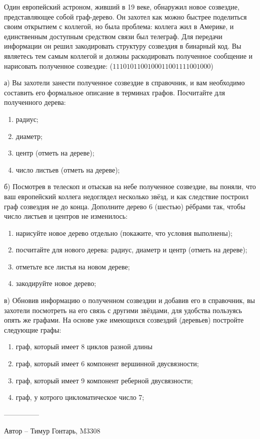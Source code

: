 \question
Один европейский астроном, живший в 19 веке, обнаружил новое созвездие, представляющее собой граф-дерево. Он захотел как можно быстрее поделиться своим открытием с коллегой, но была проблема: коллега жил в Америке, и единственным доступным средством связи был телеграф. Для передачи информации он решил закодировать структуру созвездия в бинарный код. Вы являетесь тем самым коллегой и должны раскодировать полученное сообщение и нарисовать полученное созвездие: ($1110101100100011001111001000$)

а) Вы захотели занести полученное созвездие в справочник, и вам необходимо составить его формальное описание в терминах графов. Посчитайте для полученного дерева:
\begin{enumerate}
\item радиус;
\item диаметр;
\item центр (отметь на дереве);
\item число листьев (отметь на дереве);
\end{enumerate}

б) Посмотрев в телескоп и отыскав на небе полученное созвездие, вы поняли, что ваш европейский коллега недоглядел несколько звёзд, и как следствие построил граф созвездия не до конца. Дополните дерево 6 (шестью) рёбрами так, чтобы число листьев и центров не изменилось:
\begin{enumerate}
\item нарисуйте новое дерево отдельно (покажите, что условия выполнены);
\item посчитайте для нового дерева: радиус, диаметр и центр (отметь на дереве);
\item отметьте все листья на новом дереве;
\item закодируйте новое дерево;
\end{enumerate}

в) Обновив информацию о полученном созвездии и добавив его в справочник, вы захотели посмотреть на его связь с другими звёздами, для удобства пользуясь опять же графами. На основе уже имеющихся созвездий (деревьев) постройте следующие графы:
\begin{enumerate}
\item граф, который имеет 8 циклов разной длины
\item граф, который имеет 6 компонент вершинной двусвязности;
\item граф, который имеет 9 компонент реберной двусвязности;
\item граф, у котрого цикломатическое число 7;
\end{enumerate}

---------------

Автор -- Тимур Гонтарь, M3308
